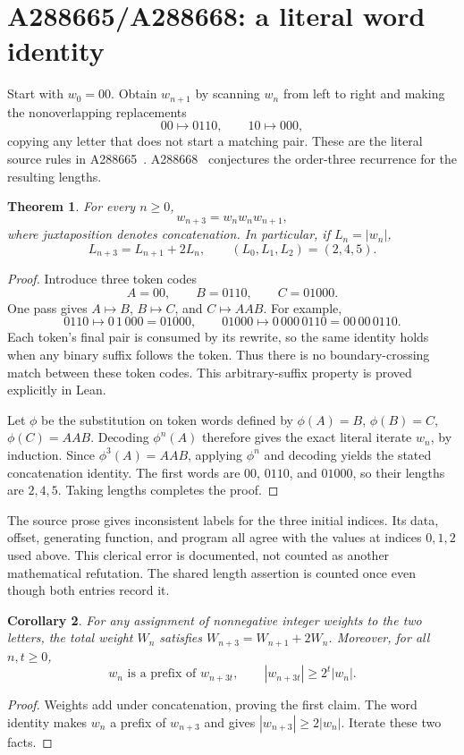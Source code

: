 \documentclass[11pt]{article}
\newtheorem{theorem}{Theorem}[section]
\newtheorem{corollary}[theorem]{Corollary}
\begin{document}
\section{A288665/A288668: a literal word identity}

Start with $w_0=00$. Obtain $w_{n+1}$ by scanning $w_n$ from left to
right and making the nonoverlapping replacements
\[
00\longmapsto0110,\qquad10\longmapsto000,
\]
copying any letter that does not start a matching pair. These are the
literal source rules in A288665~\cite{A288665}. A288668~\cite{A288668}
conjectures the order-three recurrence for the resulting lengths.

\begin{theorem}\label{thm:word8}
For every $n\geq0$,
\[
\boxed{w_{n+3}=w_nw_nw_{n+1},}
\]
where juxtaposition denotes concatenation. In particular, if $L_n=|w_n|$,
\[
L_{n+3}=L_{n+1}+2L_n,\qquad (L_0,L_1,L_2)=(2,4,5).
\]
\end{theorem}
\begin{proof}
Introduce three token codes
\[
A=00,\qquad B=0110,\qquad C=01000.
\]
One pass gives $A\mapsto B$, $B\mapsto C$, and $C\mapsto AAB$.
For example,
\[
0110\mapsto0\,1\,000=01000,
\qquad01000\mapsto0\,000\,0110=00\,00\,0110.
\]
Each token's final pair is consumed by its rewrite, so the same identity
holds when any binary suffix follows the token. Thus there is no
boundary-crossing match between these token codes. This arbitrary-suffix
property is proved explicitly in Lean.

Let $\phi$ be the substitution on token words defined by
$\phi(A)=B$, $\phi(B)=C$, $\phi(C)=AAB$. Decoding $\phi^n(A)$ therefore
gives the exact literal iterate $w_n$, by induction. Since $\phi^3(A)=AAB$,
applying $\phi^n$ and decoding yields the stated concatenation identity.
The first words are $00$, $0110$, and $01000$, so their lengths are
$2,4,5$. Taking lengths completes the proof.
\end{proof}

The source prose gives inconsistent labels for the three initial
indices. Its data, offset, generating function, and program all agree
with the values at indices $0,1,2$ used above. This clerical error is
documented, not counted as another mathematical refutation. The shared
length assertion is counted once even though both entries record it.

\begin{corollary}
For any assignment of nonnegative integer weights to the two letters,
the total weight $W_n$ satisfies $W_{n+3}=W_{n+1}+2W_n$. Moreover,
for all $n,t\geq0$,
\[
w_n\text{ is a prefix of }w_{n+3t},\qquad
|w_{n+3t}|\geq2^t|w_n|.
\]
\end{corollary}
\begin{proof}
Weights add under concatenation, proving the first claim. The word
identity makes $w_n$ a prefix of $w_{n+3}$ and gives
$|w_{n+3}|\geq2|w_n|$. Iterate these two facts.
\end{proof}
\end{document}
